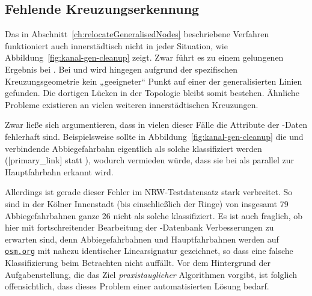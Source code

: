 \documentclass[../main/thesis.tex]{subfiles}
\begin{document}
\subsection{Fehlende Kreuzungserkennung}
\label{ch:missing-junction-detection}


Das in Abschnitt~\ref{ch:relocateGeneralisedNodes} beschriebene Verfahren funktioniert auch innerstädtisch nicht in jeder Situation, wie Abbildung~\ref{fig:kanal-gen-cleanup} zeigt.
Zwar führt es zu einem gelungenen Ergebnis bei .
Bei  und  wird hingegen aufgrund der spezifischen Kreuzungsgeometrie kein „geeigneter“ Punkt auf einer der generalisierten Linien gefunden.
Die dortigen Lücken in der Topologie bleibt somit bestehen.
Ähnliche Probleme existieren an vielen weiteren innerstädtischen Kreuzungen.

Zwar ließe sich argumentieren, dass in vielen dieser Fälle die Attribute der \osm-Daten fehlerhaft sind.
Beispielsweise sollte in Abbildung~\ref{fig:kanal-gen-cleanup} die  und  verbindende Abbiegefahrbahn eigentlich als solche klassifiziert werden ([primary\_link] statt ), wodurch vermieden würde, dass sie bei  als parallel zur Hauptfahrbahn erkannt wird. 

Allerdings ist gerade dieser Fehler im NRW-Testdatensatz stark verbreitet.
So sind in der Kölner Innenstadt (bis einschließlich der Ringe) von insgesamt 79
Abbiegefahrbahnen ganze 26
nicht als solche klassifiziert.
Es ist auch fraglich, ob hier mit fortschreitender Bearbeitung der \osm-Datenbank Verbesserungen zu erwarten sind, denn Abbiegefahrbahnen und Hauptfahrbahnen werden auf \href{https://www.openstreetmap.org/}{\nolinkurl{osm.org}} mit nahezu identischer Linearsignatur gezeichnet, so dass eine falsche Klassifizierung beim Betrachten nicht auffällt.
Vor dem Hintergrund der Aufgabenstellung, die das Ziel \emph{praxistauglicher} Algorithmen vorgibt, ist folglich offensichtlich, dass dieses Problem einer automatisierten Lösung bedarf.
\end{document}
